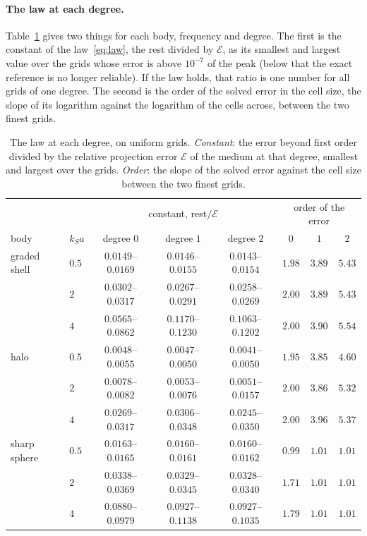\documentclass[11pt,a4paper]{article}
\newcommand{\cE}{\mathcal{E}}
\begin{document}
\paragraph{The law at each degree.} Table~\ref{tab:degreelaw} gives two things for each body, frequency
and degree. The first is the constant of the law~\eqref{eq:law}, the rest divided by $\cE$, as its
smallest and largest value over the grids whose error is above $10^{-7}$ of the peak (below that the
exact reference is no longer reliable). If the law holds, that ratio is one number for all grids of one
degree. The second is the order of the solved error in the cell size, the slope of its logarithm against
the logarithm of the cells across, between the two finest grids.
\begin{table}[htbp]
\centering
\caption{The law at each degree, on uniform grids. \emph{Constant}: the error beyond first order divided
by the relative projection error $\cE$ of the medium at that degree, smallest and largest over the
grids. \emph{Order}: the slope of the solved error against the cell size between the two finest
grids.}\label{tab:degreelaw}
\small
\begin{tabular}{@{}llcccccc@{}}
\toprule
 & & \multicolumn{3}{c}{constant, rest$/\cE$} & \multicolumn{3}{c}{order of the error} \\
body & $k_Sa$ & degree $0$ & degree $1$ & degree $2$ & $0$ & $1$ & $2$ \\
\midrule
graded shell & $0.5$ & $0.0149$--$0.0169$ & $0.0146$--$0.0155$ & $0.0143$--$0.0154$ & $1.98$ & $3.89$ & $5.43$ \\
 & $2$ & $0.0302$--$0.0317$ & $0.0267$--$0.0291$ & $0.0258$--$0.0269$ & $2.00$ & $3.89$ & $5.43$ \\
 & $4$ & $0.0565$--$0.0862$ & $0.1170$--$0.1230$ & $0.1063$--$0.1202$ & $2.00$ & $3.90$ & $5.54$ \\
\midrule
halo & $0.5$ & $0.0048$--$0.0055$ & $0.0047$--$0.0050$ & $0.0041$--$0.0050$ & $1.95$ & $3.85$ & $4.60$ \\
 & $2$ & $0.0078$--$0.0082$ & $0.0053$--$0.0076$ & $0.0051$--$0.0157$ & $2.00$ & $3.86$ & $5.32$ \\
 & $4$ & $0.0269$--$0.0317$ & $0.0306$--$0.0348$ & $0.0245$--$0.0350$ & $2.00$ & $3.96$ & $5.37$ \\
\midrule
sharp sphere & $0.5$ & $0.0163$--$0.0165$ & $0.0160$--$0.0161$ & $0.0160$--$0.0162$ & $0.99$ & $1.01$ & $1.01$ \\
 & $2$ & $0.0338$--$0.0369$ & $0.0329$--$0.0345$ & $0.0328$--$0.0340$ & $1.71$ & $1.01$ & $1.01$ \\
 & $4$ & $0.0880$--$0.0979$ & $0.0927$--$0.1138$ & $0.0927$--$0.1035$ & $1.79$ & $1.01$ & $1.01$ \\
\bottomrule
\end{tabular}
\end{table}
\end{document}
